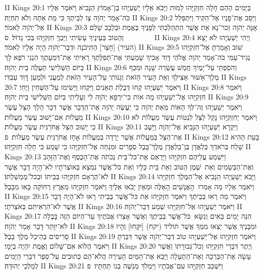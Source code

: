 II Kings 20:1	בַּיָּמִים הָהֵם חָלָה חִזְקִיָּהוּ לָמוּת וַיָּבֹא אֵלָיו יְשַׁעְיָהוּ בֶן־אָמוֹץ הַנָּבִיא וַיֹּאמֶר אֵלָיו כֹּה־אָמַר יְהֹוָה צַו לְבֵיתֶךָ כִּי מֵת אַתָּה וְלֹא תִחְיֶה׃
II Kings 20:2	וַיַּסֵּב אֶת־פָּנָיו אֶל־הַקִּיר וַיִּתְפַּלֵּל אֶל־יְהֹוָה לֵאמֹר׃
II Kings 20:3	אָנָּה יְהֹוָה זְכר־נָא אֵת אֲשֶׁר הִתְהַלַּכְתִּי לְפָנֶיךָ בֶּאֱמֶת וּבְלֵבָב שָׁלֵם וְהַטּוֹב בְּעֵינֶיךָ עָשִׂיתִי וַיֵּבְךְּ חִזְקִיָּהוּ בְּכִי גָדוֹל׃ {ס}        
II Kings 20:4	וַיְהִי יְשַׁעְיָהוּ לֹא יָצָא (העיר) [חָצֵר] הַתִּיכֹנָה וּדְבַר־יְהֹוָה הָיָה אֵלָיו לֵאמֹר׃
II Kings 20:5	שׁוּב וְאָמַרְתָּ אֶל־חִזְקִיָּהוּ נְגִיד־עַמִּי כֹּה־אָמַר יְהֹוָה אֱלֹהֵי דָּוִד אָבִיךָ שָׁמַעְתִּי אֶת־תְּפִלָּתֶךָ רָאִיתִי אֶת־דִּמְעָתֶךָ הִנְנִי רֹפֶא לָךְ בַּיּוֹם הַשְּׁלִישִׁי תַּעֲלֶה בֵּית יְהֹוָה׃
II Kings 20:6	וְהֹסַפְתִּי עַל־יָמֶיךָ חֲמֵשׁ עֶשְׂרֵה שָׁנָה וּמִכַּף מֶלֶךְ־אַשּׁוּר אַצִּילְךָ וְאֵת הָעִיר הַזֹּאת וְגַנּוֹתִי עַל־הָעִיר הַזֹּאת לְמַעֲנִי וּלְמַעַן דָּוִד עַבְדִּי׃
II Kings 20:7	וַיֹּאמֶר יְשַׁעְיָהוּ קְחוּ דְּבֶלֶת תְּאֵנִים וַיִּקְחוּ וַיָּשִׂימוּ עַל־הַשְּׁחִין וַיֶּחִי׃
II Kings 20:8	וַיֹּאמֶר חִזְקִיָּהוּ אֶל־יְשַׁעְיָהוּ מָה אוֹת כִּי־יִרְפָּא יְהֹוָה לִי וְעָלִיתִי בַּיּוֹם הַשְּׁלִישִׁי בֵּית יְהֹוָה׃
II Kings 20:9	וַיֹּאמֶר יְשַׁעְיָהוּ זֶה־לְּךָ הָאוֹת מֵאֵת יְהֹוָה כִּי יַעֲשֶׂה יְהֹוָה אֶת־הַדָּבָר אֲשֶׁר דִּבֵּר הָלַךְ הַצֵּל עֶשֶׂר מַעֲלוֹת אִם־יָשׁוּב עֶשֶׂר מַעֲלוֹת׃
II Kings 20:10	וַיֹּאמֶר יְחִזְקִיָּהוּ נָקֵל לַצֵּל לִנְטוֹת עֶשֶׂר מַעֲלוֹת לֹא כִי יָשׁוּב הַצֵּל אֲחֹרַנִּית עֶשֶׂר מַעֲלוֹת׃
II Kings 20:11	וַיִּקְרָא יְשַׁעְיָהוּ הַנָּבִיא אֶל־יְהֹוָה וַיָּשֶׁב אֶת־הַצֵּל בַּמַּעֲלוֹת אֲשֶׁר יָרְדָה בְּמַעֲלוֹת אָחָז אֲחֹרַנִּית עֶשֶׂר מַעֲלוֹת׃ {פ}
II Kings 20:12	בָּעֵת הַהִיא שָׁלַח בְּרֹאדַךְ בַּלְאֲדָן בֶּן־בַּלְאֲדָן מֶלֶךְ־בָּבֶל סְפָרִים וּמִנְחָה אֶל־חִזְקִיָּהוּ כִּי שָׁמַע כִּי חָלָה חִזְקִיָּהוּ׃
II Kings 20:13	וַיִּשְׁמַע עֲלֵיהֶם חִזְקִיָּהוּ וַיַּרְאֵם אֶת־כּל־בֵּית נְכֹתֹה אֶת־הַכֶּסֶף וְאֶת־הַזָּהָב וְאֶת־הַבְּשָׂמִים וְאֵת  שֶׁמֶן הַטּוֹב וְאֵת בֵּית כֵּלָיו וְאֵת כּל־אֲשֶׁר נִמְצָא בְּאוֹצְרֹתָיו לֹא־הָיָה דָבָר אֲשֶׁר לֹא־הֶרְאָם חִזְקִיָּהוּ בְּבֵיתוֹ וּבְכל־מֶמְשַׁלְתּוֹ׃
II Kings 20:14	וַיָּבֹא יְשַׁעְיָהוּ הַנָּבִיא אֶל־הַמֶּלֶךְ חִזְקִיָּהוּ וַיֹּאמֶר אֵלָיו מָה אָמְרוּ  הָאֲנָשִׁים הָאֵלֶּה וּמֵאַיִן יָבֹאוּ אֵלֶיךָ וַיֹּאמֶר חִזְקִיָּהוּ מֵאֶרֶץ רְחוֹקָה בָּאוּ מִבָּבֶל׃
II Kings 20:15	וַיֹּאמֶר מָה רָאוּ בְּבֵיתֶךָ וַיֹּאמֶר חִזְקִיָּהוּ אֵת כּל־אֲשֶׁר בְּבֵיתִי רָאוּ לֹא־הָיָה דָבָר אֲשֶׁר לֹא־הִרְאִיתִם בְּאֹצְרֹתָי׃
II Kings 20:16	וַיֹּאמֶר יְשַׁעְיָהוּ אֶל־חִזְקִיָּהוּ שְׁמַע דְּבַר־יְהֹוָה׃
II Kings 20:17	הִנֵּה יָמִים בָּאִים וְנִשָּׂא  כּל־אֲשֶׁר בְּבֵיתֶךָ וַאֲשֶׁר אָצְרוּ אֲבֹתֶיךָ עַד־הַיּוֹם הַזֶּה בָּבֶלָה לֹא־יִוָּתֵר דָּבָר אָמַר יְהֹוָה׃
II Kings 20:18	וּמִבָּנֶיךָ אֲשֶׁר יֵצְאוּ מִמְּךָ אֲשֶׁר תּוֹלִיד (יקח) [יִקָּחוּ] וְהָיוּ סָרִיסִים בְּהֵיכַל מֶלֶךְ בָּבֶל׃
II Kings 20:19	וַיֹּאמֶר חִזְקִיָּהוּ אֶל־יְשַׁעְיָהוּ טוֹב דְּבַר־יְהֹוָה אֲשֶׁר דִּבַּרְתָּ וַיֹּאמֶר הֲלוֹא אִם־שָׁלוֹם וֶאֱמֶת יִהְיֶה בְיָמָי׃
II Kings 20:20	וְיֶתֶר דִּבְרֵי חִזְקִיָּהוּ וְכל־גְּבוּרָתוֹ וַאֲשֶׁר עָשָׂה אֶת־הַבְּרֵכָה וְאֶת־הַתְּעָלָה וַיָּבֵא אֶת־הַמַּיִם הָעִירָה הֲלֹא־הֵם כְּתוּבִים עַל־סֵפֶר דִּבְרֵי הַיָּמִים לְמַלְכֵי יְהוּדָה׃
II Kings 20:21	וַיִּשְׁכַּב חִזְקִיָּהוּ עִם־אֲבֹתָיו וַיִּמְלֹךְ מְנַשֶּׁה בְנוֹ תַּחְתָּיו׃ {פ}

